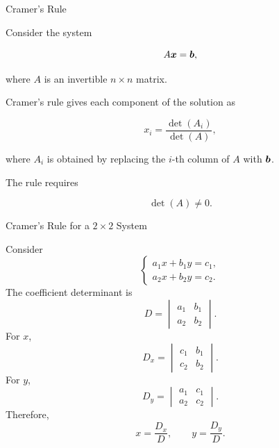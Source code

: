 \begin{frame}{Cramer's Rule}

Consider the system

\[
A\bm{x}=\bm{b},
\]

where $A$ is an invertible $n\times n$ matrix.

Cramer's rule gives each component of the solution as

\[
\boxed{
x_i
=
\frac{\det(A_i)}{\det(A)},
}
\]

where $A_i$ is obtained by replacing the $i$-th column of $A$
with $\bm{b}$.

\vspace{0.4cm}

The rule requires

\[
\boxed{
\det(A)\neq0.
}
\]

\end{frame}



\begin{frame}{Cramer's Rule for a $2\times2$ System}

Consider
\vspace{-0.1cm}
\[
\begin{cases}
a_1x+b_1y=c_1,\\
a_2x+b_2y=c_2.
\end{cases}
\]
\vspace{-0.1cm}
The coefficient determinant is
\vspace{-0.1cm}
\[
D=
\begin{vmatrix}
a_1&b_1\\
a_2&b_2
\end{vmatrix}.
\]
\vspace{-0.1cm}
For $x$,
\vspace{-0.1cm}
\[
D_x=
\begin{vmatrix}
c_1&b_1\\
c_2&b_2
\end{vmatrix}.
\]
\vspace{-0.1cm}
For $y$,
\vspace{-0.1cm}
\[
D_y=
\begin{vmatrix}
a_1&c_1\\
a_2&c_2
\end{vmatrix}.
\]
\vspace{-0.1cm}
Therefore,
\vspace{-0.1cm}
\[
\boxed{
x=\frac{D_x}{D},
\qquad
y=\frac{D_y}{D}.
}
\]

\end{frame}


